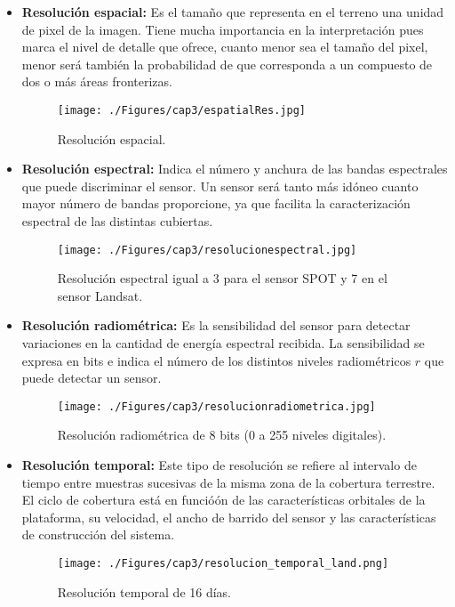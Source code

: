 \begin{itemize}
		\item \textbf{Resolución espacial:} Es el tamaño que representa en el terreno una unidad de pixel de la imagen. Tiene mucha importancia en la interpretaci\'on pues marca el nivel de detalle que ofrece, cuanto menor sea el tama\~{n}o del pixel, menor ser\'a tambi\'en la probabilidad de que corresponda a un compuesto de dos o m\'as \'areas fronterizas.
		\begin{figure}[H]
			\centering
			\texttt{[image: ./Figures/cap3/espatialRes.jpg]}
			\caption{Resoluci\'on espacial.}
			\label{fig:espatialRes}
		\end{figure}
			\item \textbf{Resoluci\'on espectral:} Indica el n\'umero y anchura de las bandas espectrales que puede discriminar el sensor. Un sensor ser\'a tanto m\'as id\'oneo cuanto mayor n\'umero de bandas proporcione, ya que facilita la caracterizaci\'on espectral de las distintas cubiertas.
				\begin{figure}[H]
					\centering
					\texttt{[image: ./Figures/cap3/resolucionespectral.jpg]}
					\caption{Resoluci\'on espectral igual a 3 para el sensor SPOT y 7 en el sensor Landsat.}
					\label{fig:espectralRes}
				\end{figure}
		\item \textbf{Resoluci\'on radiom\'etrica:} Es la sensibilidad del sensor para detectar variaciones en la cantidad de energ\'ia espectral recibida. La sensibilidad se expresa en bits e indica el n\'umero de los distintos niveles radiom\'etricos $ r $ que puede detectar un sensor.
						\begin{figure}[H]
							\centering
							\texttt{[image: ./Figures/cap3/resolucionradiometrica.jpg]}
							\caption{Resoluci\'on radiom\'etrica de 8 bits (0 a 255 niveles digitales).}
							\label{fig:radioRes}
						\end{figure}
		\item \textbf{Resoluci\'on temporal:} Este tipo de resoluci\'on se refiere al intervalo de tiempo entre muestras sucesivas de la misma zona de la cobertura terrestre. El ciclo de cobertura est\'a en funció\'on de las caracter\'isticas orbitales de la plataforma, su velocidad, el ancho de barrido del sensor y las caracter\'isticas de construcci\'on del sistema.
			\begin{figure}[H]
					\centering
					\texttt{[image: ./Figures/cap3/resolucion\_temporal\_land.png]}
					\caption{Resoluci\'on temporal de 16 d\'ias.}
					\label{fig:temporaRes}
				\end{figure}
		

		
	\end{itemize}

